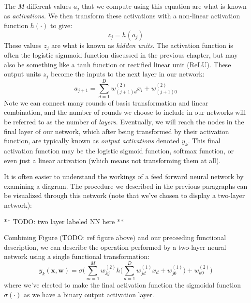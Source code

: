 The $M$ different values $a_{j}$ that we compute using this equation are what is known as \textit{activations}. We then transform these activations with a non-linear activation function $h(\cdot)$ to give:
\begin{equation} \label{basic-nn-z-outputs}
	z_{j} = h(a_{j})
\end{equation}
These values $z_{j}$ are what is known as \textit{hidden units}. The activation function is often the logistic signmoid function discussed in the previous chapter, but may also be something like a tanh function or rectified linear unit (ReLU). These output units $z_{j}$ become the inputs to the next layer in our network:
\begin{equation} \label{basic-nn-form-next-layer}
	a_{j+1} = \sum_{d=1}^{D} w_{(j+1)d}^{(2)} x_{i} + w_{(j+1)0}^{(2)}
\end{equation}
Note we can connect many rounds of basis transformation and linear combination, and the number of rounds we choose to include in our networks will be referred to as the number of \textit{layers}. Eventually, we will reach the nodes in the final layer of our network, which after being transformed by their activation function, are typically known as \textit{output activations} denoted $y_{k}$. This final activation function may be the logistic sigmoid function, softmax function, or even just a linear activation (which means not transforming them at all).

It is often easier to understand the workings of a feed forward neural network by examining a diagram. The procedure we described in the previous paragraphs can be visualized through this network (note that we've chosen to display a two-layer network):

** TODO: two layer labeled NN here **


Combining Figure (TODO: ref figure above) and our preceeding functional description, we can describe the operation performed by a two-layer neural network using a single functional transformation:
\begin{equation} \label{full-nn-equation}
	y_{k}(\textbf{x}, \textbf{w}) = \sigma\bigg(\sum_{m=1}^{M}w_{kj}^{(2)} h\bigg(\sum_{d=1}^{D}w_{jd}^{(1)}x_{d} + w_{j0}^{(1)}\bigg) + w_{k0}^{(2)}\bigg)
\end{equation}
where we've elected to make the final activation function the sigmoidal function $\sigma(\cdot)$ as we have a binary output activation layer.

